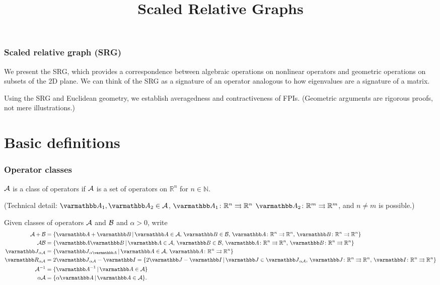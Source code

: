 \documentclass[10pt,mathserif]{beamer}
\title{\large \bfseries Scaled Relative Graphs}
\begin{document}
\frame{
\thispagestyle{empty}
\titlepage
}



\begin{frame}
\frametitle{Scaled relative graph (SRG)}

We present the SRG, which provides a correspondence between algebraic operations on nonlinear operators and geometric operations on subsets of the 2D plane. We can think of the SRG as a signature of an operator analogous to how eigenvalues are a signature of a matrix.

\vspace{0.2in}
Using the SRG and Euclidean geometry, we establish averagedness and contractiveness of FPIs.
(Geometric arguments are rigorous proofs, not mere illustrations.)
\end{frame}

\section{Basic definitions}

\begin{frame}
\frametitle{Operator classes}
${\mathcal{A}}$ is a class of operators if  ${\mathcal{A}}$ is a set of operators on $\mathbb{R}^n$ for $n\in \mathbb{N}$.

(Technical detail: $\opA_1,\opA_2\in \cA$, $\opA_1\colon\reals^n\rightrightarrows\reals^n$ $\opA_2\colon\reals^m\rightrightarrows\reals^m$, and $n\ne m$ is possible.)

\vspace{0.2in}
Given classes of operators ${\mathcal{A}}$ and ${\mathcal{B}}$ and $\alpha>0$, write
\begin{align*}
\cA+\cB&=\{\opA+\opB\,|\,\opA\in \cA,\,\opB\in \cB,\,\opA\colon\reals^n\rightrightarrows\reals^n,\,\opB\colon\reals^n\rightrightarrows\reals^n\}\\
\cA\cB&=\{\opA\opB\,|\,\opA\in \cA,\,\opB\in \cB,\,\opA\colon\reals^n\rightrightarrows\reals^n,\,\opB\colon\reals^n\rightrightarrows\reals^n\}\\
\opJ_{\alpha \cA}&=\{\opJ_{\alpha \opA}\,|\,\opA\in \cA,\,\opA\colon\reals^n\rightrightarrows\reals^n\}\\
\opR_{\alpha \cA}&=2\opJ_{\alpha \cA}-\opI=\{2\opJ-\opI\,|\,\opJ\in\opJ_{\alpha \cA},\,\opJ\colon\reals^n\rightrightarrows \reals^n,\,\opI\colon\reals^n\rightrightarrows\reals^n\}\\
 \cA^{-1}&=\{ \opA^{-1}\,|\,\opA\in \cA\}\\
\alpha \cA&=\{\alpha \opA\,|\,\opA\in \cA\}.
\end{align*}
\end{frame}
\end{document}

